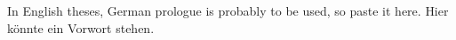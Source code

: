 \mbox{}\thispagestyle{empty}

\vspace*{1cm}

{\Large \textbf{}} 

\bigskip

{
In English theses, German prologue is probably to be used, so paste it here. \blindtext
}
{
Hier könnte ein Vorwort stehen.
}